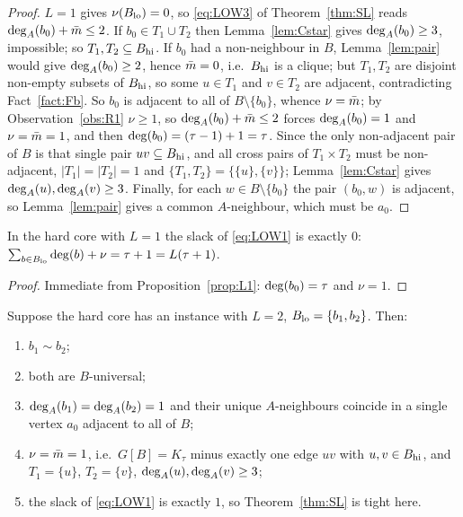 \begin{proof}
$L = 1$ gives $\nu(B_{\mathrm{lo}}) = 0$, so \eqref{eq:LOW3} of Theorem~\ref{thm:SL} reads
$\mathrm{deg}_A(b_0) + \bar{m} \le 2$. If $b_0 \in T_1 \cup T_2$ then Lemma~\ref{lem:Cstar} gives
$\mathrm{deg}_A(b_0) \ge 3$, impossible; so $T_1, T_2 \subseteq B_{\mathrm{hi}}$. If $b_0$ had a non-neighbour
in $B$, Lemma~\ref{lem:pair} would give $\mathrm{deg}_A(b_0) \ge 2$, hence $\bar{m} = 0$, i.e.\ $B_{\mathrm{hi}}$
is a clique; but $T_1, T_2$ are disjoint non-empty subsets of $B_{\mathrm{hi}}$, so some $u \in T_1$
and $v \in T_2$ are adjacent, contradicting Fact~\ref{fact:Fb}. So $b_0$ is adjacent to all
of $B \setminus \{b_0\}$, whence $\nu = \bar{m}$; by Observation~\ref{obs:R1} $\nu \ge 1$, so
$\mathrm{deg}_A(b_0) + \bar{m} \le 2$ forces $\mathrm{deg}_A(b_0) = 1$ and $\nu = \bar{m} = 1$, and then
$\mathrm{deg}(b_0) = (\tau-1)+1 = \tau$. Since the only non-adjacent pair of $B$ is that single pair
$uv \subseteq B_{\mathrm{hi}}$, and all cross pairs of $T_1 \times T_2$ must be non-adjacent,
$|T_1| = |T_2| = 1$ and $\{T_1,T_2\} = \{\{u\},\{v\}\}$; Lemma~\ref{lem:Cstar} gives
$\mathrm{deg}_A(u),\mathrm{deg}_A(v) \ge 3$. Finally, for each $w \in B \setminus \{b_0\}$ the pair
$(b_0,w)$ is adjacent, so Lemma~\ref{lem:pair} gives a common $A$-neighbour, which must be
$a_0$.
\end{proof}

\begin{corollary}\label{cor:L1prime}
In the hard core with $L = 1$ the slack of \eqref{eq:LOW1} is exactly $0$:
$\sum_{b \in B_{\mathrm{lo}}}\mathrm{deg}(b) + \nu = \tau + 1 = L(\tau+1)$.
\end{corollary}

\begin{proof}
Immediate from Proposition~\ref{prop:L1}: $\mathrm{deg}(b_0) = \tau$ and $\nu = 1$.
\end{proof}

\begin{proposition}[$L = 2$ is rigid]\label{prop:L2}
Suppose the hard core has an instance with $L = 2$, $B_{\mathrm{lo}} = \{b_1,b_2\}$. Then:
\begin{enumerate}[label=\textup{(\alph*)}]
\item $b_1 \sim b_2$;
\item both are $B$-universal;
\item $\mathrm{deg}_A(b_1) = \mathrm{deg}_A(b_2) = 1$ and their unique $A$-neighbours coincide in a single
vertex $a_0$ adjacent to all of $B$;
\item $\nu = \bar{m} = 1$, i.e.\ $G[B] = K_\tau$ minus exactly one edge $uv$ with
$u,v \in B_{\mathrm{hi}}$, and $T_1 = \{u\}$, $T_2 = \{v\}$, $\mathrm{deg}_A(u),\mathrm{deg}_A(v) \ge 3$;
\item the slack of \eqref{eq:LOW1} is exactly $1$, so Theorem~\ref{thm:SL} is tight here.
\end{enumerate}
\end{proposition}

